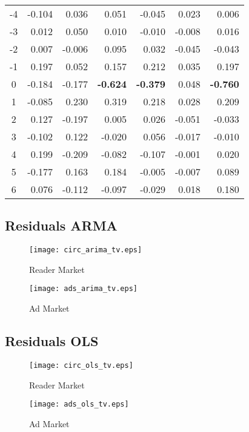 \documentclass[10pt,a4paper]{scrreprt}
\begin{document}
\begin{table}[htbp]
\begin{tabular}{c|rrr|rrr|}
    -4    & -0.104 & 0.036 & 0.051 & -0.045 & 0.023 & 0.006 \\
    -3    & 0.012 & 0.050 & 0.010 & -0.010 & -0.008 & 0.016 \\
    -2    & 0.007 & -0.006 & 0.095 & 0.032 & -0.045 & -0.043 \\
    -1    & 0.197 & 0.052 & 0.157 & 0.212 & 0.035 & 0.197 \\
    0     & -0.184 & -0.177 & \textbf{-0.624} & \textbf{-0.379} & 0.048 & \textbf{-0.760} \\
    1     & -0.085 & 0.230 & 0.319 & 0.218 & 0.028 & 0.209 \\
    2     & 0.127 & -0.197 & 0.005 & 0.026 & -0.051 & -0.033 \\
    3     & -0.102 & 0.122 & -0.020 & 0.056 & -0.017 & -0.010 \\
    4     & 0.199 & -0.209 & -0.082 & -0.107 & -0.001 & 0.020 \\
    5     & -0.177 & 0.163 & 0.184 & -0.005 & -0.007 & 0.089 \\
    6     & 0.076 & -0.112 & -0.097 & -0.029 & 0.018 & 0.180 \\
    \end{tabular}%
  \label{tab:ccf}%
\end{table}%

\subsection{Residuals ARMA}
\begin{figure}[H]
\begin{minipage}[hbt]{7cm}
	\centering
	\texttt{[image: circ\_arima\_tv.eps]}
	\caption{Reader Market}
	\label{tvcirc}
\end{minipage}
\hfill
\begin{minipage}[hbt]{7cm}
	\centering
	\texttt{[image: ads\_arima\_tv.eps]}
	\caption{Ad Market}
	\label{tvadsite}
\end{minipage}
\end{figure}

\subsection{Residuals OLS}
\begin{figure}[H]
\begin{minipage}[hbt]{7cm}
	\centering
	\texttt{[image: circ\_ols\_tv.eps]}
	\caption{Reader Market}
	\label{tvcirc}
\end{minipage}
\hfill
\begin{minipage}[hbt]{7cm}
	\centering
	\texttt{[image: ads\_ols\_tv.eps]}
	\caption{Ad Market}
	\label{tvadsite}
\end{minipage}
\end{figure}
\end{document}
